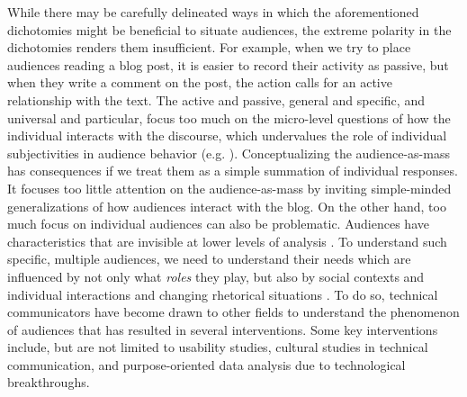While there may be carefully delineated ways in which the aforementioned dichotomies might be beneficial to situate audiences, the extreme polarity in the dichotomies renders them insufficient. For example, when we try to place audiences reading a blog post, it is easier to record their activity as passive, but when they write a comment on the post, the action calls for an active relationship with the text. The active and passive, general and specific, and universal and particular, focus too much on the micro-level questions of how the individual interacts with the discourse, which undervalues the role of individual subjectivities in audience behavior (e.g. \cite{rosenstein1997reconceptualizing}). Conceptualizing the audience-as-mass has consequences if we treat them as a simple summation of individual responses. It focuses too little attention on the audience-as-mass by inviting simple-minded generalizations of how audiences interact with the blog. On the other hand, too much focus on individual audiences can also be problematic. Audiences have characteristics that are invisible at lower levels of analysis \cite{webster2006audience}. To understand such specific, multiple audiences, we need to understand their needs which are influenced by not only what \textit{roles} they play, but also by social contexts and individual interactions and changing rhetorical situations \cite{spilka1990orality}. To do so, technical communicators have become drawn to other fields to understand the phenomenon of audiences that has resulted in several interventions. Some key interventions include, but are not limited to usability studies, cultural studies in technical communication, and purpose-oriented data analysis due to technological breakthroughs.

